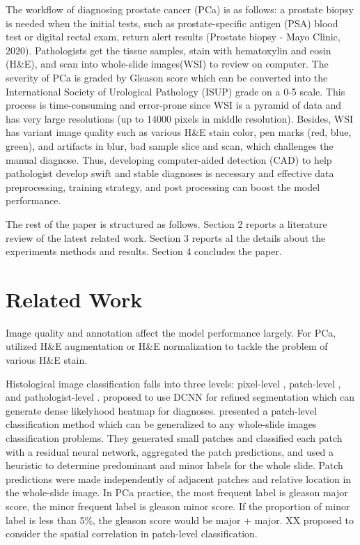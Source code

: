 \documentclass{article}
\begin{document}
The workflow of diagnosing prostate cancer (PCa) is as follows: a prostate biopsy is needed when the initial tests, such as prostate-specific antigen (PSA) blood test or digital rectal exam, return alert results (Prostate biopsy - Mayo Clinic, 2020). Pathologists get the tissue samples, stain with hematoxylin and eosin (H\&E), and scan into whole-slide images(WSI) to review on computer. The severity of PCa is graded by Gleason score which can be converted into the International Society of Urological Pathology (ISUP) grade on a 0-5 scale. This process is time-consuming and error-prone since WSI is a pyramid of data and has very large resolutions (up to 14000 pixels in middle resolution). Besides, WSI has variant image quality such as various H\&E stain color, pen marks (red, blue, green), and artifacts in blur, bad sample slice and scan, which challenges the manual diagnose. Thus, developing computer-aided detection (CAD) to help pathologist develop swift and stable diagnoses is necessary and effective data preprocessing, training strategy, and post processing can boost the model performance. 

The rest of the paper is structured as follows. Section 2 reports a literature review of the latest related work. Section 3 reports al the details about the experiments methods and results. Section 4 concludes the paper. 




\section{Related Work}

Image quality and annotation affect the model performance largely. For PCa, \citep{tellez2018h} utilized H\&E augmentation or H\&E normalization to tackle the problem of various H\&E stain. 

Histological image classification falls into three levels: pixel-level \citep{guo2019fast}, patch-level \citep{wei2019pathologist}, and pathologist-level \citep{wei2019pathologist}.  \citep{guo2019fast} proposed to use DCNN for refined segmentation which can generate dense likelyhood heatmap for diagnoses. \citep{wei2019pathologist} presented a patch-level classification method which can be generalized to any whole-slide images classification problems. They generated small patches and classified each patch with a residual neural network, aggregated the patch predictions, and used a heuristic to determine predominant and minor labels for the whole slide. Patch predictions were made independently of adjacent patches and relative location in the whole-slide image. In PCa practice, the most frequent label is gleason major score, the minor frequent label is gleason minor score. If the proportion of minor label is less than 5\%, the gleason score would be major + major. XX proposed to consider the spatial correlation in patch-level classification.
\end{document}
